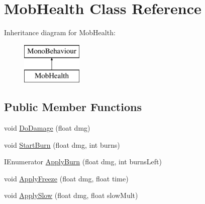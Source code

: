 \hypertarget{class_mob_health}{}\section{Mob\+Health Class Reference}
\label{class_mob_health}
Inheritance diagram for Mob\+Health\+:\begin{figure}[H]
\begin{center}
\leavevmode
\includegraphics[height=2.000000cm]{class_mob_health}
\end{center}
\end{figure}
\subsection*{Public Member Functions}
\begin{DoxyCompactItemize}
\item 
void \hyperlink{class_mob_health_adaf878419692a8b6a16f8f3861a6c74e}{Do\+Damage} (float dmg)
\item 
void \hyperlink{class_mob_health_abcc0a1a5fef542a2c5f83e3d80d21d18}{Start\+Burn} (float dmg, int burns)
\item 
I\+Enumerator \hyperlink{class_mob_health_a90c10dc6ba571545b3d466ec83ebf6e7}{Apply\+Burn} (float dmg, int burns\+Left)
\item 
void \hyperlink{class_mob_health_ac4b90844fdf1be4b5fad4693c48bd61f}{Apply\+Freeze} (float dmg, float time)
\item 
void \hyperlink{class_mob_health_a7374507ad90db5ced9395476a3943230}{Apply\+Slow} (float dmg, float slow\+Mult)
\end{DoxyCompactItemize}
